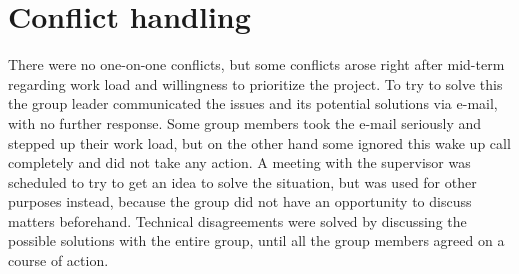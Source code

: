 \section{Conflict handling}
There were no one-on-one conflicts, but some conflicts arose right after mid-term regarding work load and willingness to prioritize the project. To try to solve this the group leader communicated the issues and its potential solutions via e-mail, with no further response. Some group members took the e-mail seriously and stepped up their work load, but on the other hand some ignored this wake up call completely and did not take any action. A meeting with the supervisor was scheduled to try to get an idea to solve the situation, but was used for other purposes instead, because the group did not have an opportunity to discuss matters beforehand.
Technical disagreements were solved by discussing the possible solutions with the entire group, until all the group members agreed on a course of action.
